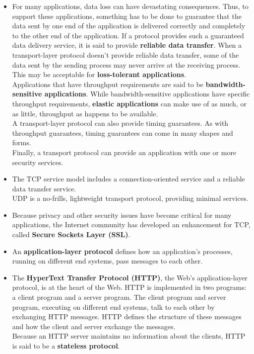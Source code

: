 \begin{itemize}
\item
For many applications, data loss can have devastating consequences. Thus, to support these applications, something has to be done to guarantee that the data sent by one end of the application is delivered correctly and completely to the other end of the application. If a protocol provides such a guaranteed data delivery service, it is said to provide \textbf{reliable data transfer}. When a transport-layer protocol doesn't provide reliable data transfer, some of the data sent by the sending process may never arrive at the receiving process. This may be acceptable for \textbf{loss-tolerant applications}.\\
Applications that have throughput requirements are said to be \textbf{bandwidth-sensitive applications}. While bandwidth-sensitive applications have specific throughput requirements, \textbf{elastic applications} can make use of as much, or as little, throughput as happens to be available.\\
A transport-layer protocol can also provide timing guarantees. As with throughput guarantees, timing guarantees can come in many shapes and forms.\\
Finally, a transport protocol can provide an application with one or more security services.

\item
The TCP service model includes a connection-oriented service and a reliable data transfer service.\\
UDP is a no-frills, lightweight transport protocol, providing minimal services.

\item
Because privacy and other security issues have become critical for many applications, the Internet community has developed an enhancement for TCP, called \textbf{Secure Sockets Layer (SSL)}.

\item
An \textbf{application-layer protocol} defines how an application's processes, running on different end systems, pass messages to each other.

\item
The \textbf{HyperText Transfer Protocol (HTTP)}, the Web's application-layer protocol, is at the heart of the Web. HTTP is implemented in two programs: a client program and a server program. The client program and server program, executing on different end systems, talk to each other by exchanging HTTP messages. HTTP defines the structure of these messages and how the client and server exchange the messages.\\Because an HTTP server maintains no information about the clients, HTTP is said to be a \textbf{stateless protocol}.


\end{itemize}
